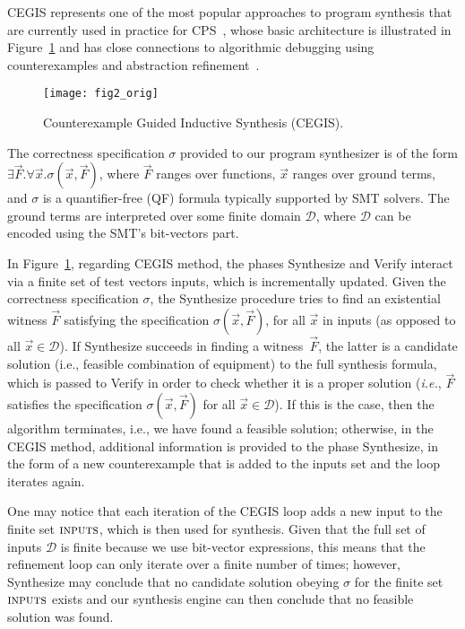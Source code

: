 CEGIS represents one of the most popular approaches to program synthesis that are currently used in practice for CPS~\cite{Abateetal2017}, whose basic architecture is illustrated in Figure~\ref{Counter-Example-Guided-Inductive-Synthesis} and has close connections to algorithmic debugging using counterexamples and abstraction refinement~\cite{Alur}. 

\begin{figure}[h]
	\centering
	\texttt{[image: fig2\_orig]}
	\caption{Counterexample Guided Inductive Synthesis (CEGIS).}
	\label{Counter-Example-Guided-Inductive-Synthesis}
\end{figure}

The correctness specification $\sigma$ provided to our program synthesizer is of the form $\exists \vec{F} .  \forall \vec{x}.  \sigma(\vec{x}, \vec{F})$, where $\vec{F}$ ranges over functions, $\vec{x}$ ranges over ground terms, and $\sigma$ is a quantifier-free (QF) formula typically supported by SMT solvers. The ground terms are interpreted over some finite domain $\mathcal{D}$, where $\mathcal{D}$ can be encoded using the SMT's bit-vectors part. 

In Figure~\ref{Counter-Example-Guided-Inductive-Synthesis}, regarding CEGIS method, the phases {\sc Synthesize} and {\sc Verify} interact via a finite set of test vectors {\sc inputs}, which is incrementally updated. Given the correctness specification $\sigma$, the {\sc Synthesize} procedure tries to find an existential witness $\vec{F}$ satisfying the specification $\sigma(\vec{x}, \vec{F})$, for all $\vec{x}$ in {\sc inputs} (as opposed to all $\vec{x} \in \mathcal{D}$). If {\sc Synthesize} succeeds in finding a witness~$\vec{F}$, the latter is a candidate solution (i.e., feasible combination of equipment) to the full synthesis formula, which is passed to {\sc Verify} in order to check whether it is a proper solution ({\it i.e.}, $\vec{F}$ satisfies the specification $\sigma(\vec{x}, \vec{F})$ for all $\vec{x}\in\mathcal{D}$). If this is the case, then the algorithm terminates, i.e., we have found a feasible solution; otherwise, in the CEGIS method, additional information is provided to the phase {\sc Synthesize}, in the form of a new counterexample that is added to the {\sc inputs} set and the loop iterates again.

One may notice that each iteration of the CEGIS loop adds a new input to the finite set $\text{\sc inputs}$, which is then used for synthesis.  Given that the full set of inputs $\mathcal{D}$ is finite because we use bit-vector expressions, this means that the refinement loop can only iterate over a finite number of times; however, {\sc Synthesize} may conclude that no candidate solution obeying $\sigma$ for the finite set $\text{\sc inputs}$ exists and our synthesis engine can then conclude that no feasible solution was found.


